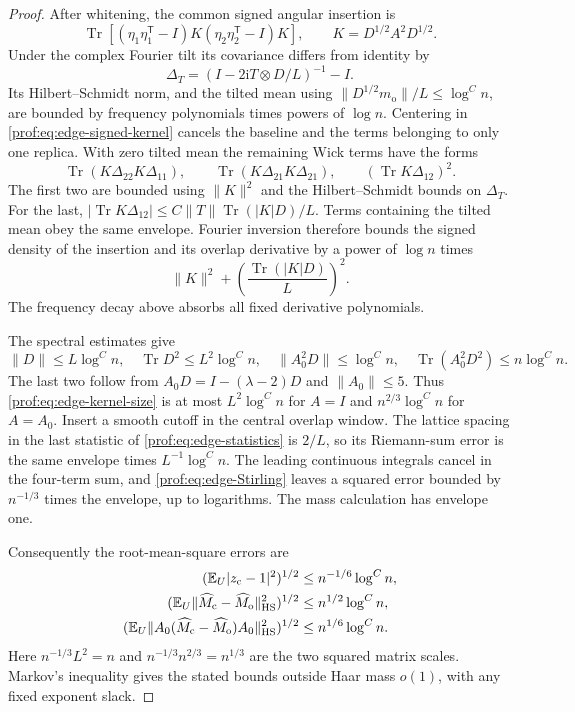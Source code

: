 \begin{proof}
After whitening, the common signed angular insertion is
\begin{equation}\label{prof:eq:edge-signed-kernel}
 \operatorname{Tr}\!\left[
 (\eta_1\eta_1^{\mathsf T}-I)K
 (\eta_2\eta_2^{\mathsf T}-I)K\right],
 \qquad K=D^{1/2}A^2D^{1/2}.
\end{equation}
Under the complex Fourier tilt its covariance differs from identity by
\[
 \Delta_T=(I-2\mathrm iT\otimes D/L)^{-1}-I.
\]
Its Hilbert--Schmidt norm, and the tilted mean using
$\|D^{1/2}m_{\mathrm o}\|/L\le\log^C n$, are bounded by frequency
polynomials times powers of $\log n$. Centering in
\eqref{prof:eq:edge-signed-kernel} cancels the baseline and the terms
belonging to only one replica. With zero tilted mean the remaining Wick
terms have the forms
\[
 \operatorname{Tr}(K\Delta_{22}K\Delta_{11}),\qquad
 \operatorname{Tr}(K\Delta_{21}K\Delta_{21}),\qquad
 (\operatorname{Tr}K\Delta_{12})^2.
\]
The first two are bounded using $\|K\|^2$ and the Hilbert--Schmidt
bounds on $\Delta_T$. For the last,
$|\operatorname{Tr}K\Delta_{12}|\le
 C\|T\|\operatorname{Tr}(|K|D)/L$. Terms containing the tilted mean
obey the same envelope. Fourier inversion therefore bounds the signed
density of the insertion and its overlap derivative by a power of
$\log n$ times
\begin{equation}\label{prof:eq:edge-kernel-size}
 \|K\|^2+\left(\frac{\operatorname{Tr}(|K|D)}L\right)^2.
\end{equation}
The frequency decay above absorbs all fixed derivative polynomials.

The spectral estimates give
\[
 \|D\|\le L\log^C n,\quad \operatorname{Tr}D^2\le L^2\log^C n,
 \quad \|A_0^2D\|\le\log^C n,\quad
 \operatorname{Tr}(A_0^2D^2)\le n\log^C n.
\]
The last two follow from $A_0D=I-(\lambda-2)D$ and $\|A_0\|\le5$.
Thus \eqref{prof:eq:edge-kernel-size} is at most $L^2\log^C n$ for
$A=I$ and $n^{2/3}\log^C n$ for $A=A_0$. Insert a smooth cutoff in
the central overlap window. The lattice spacing in the last statistic
of \eqref{prof:eq:edge-statistics} is $2/L$, so its Riemann-sum error
is the same envelope times $L^{-1}\log^C n$. The leading continuous
integrals cancel in the four-term sum, and
\eqref{prof:eq:edge-Stirling} leaves a squared error bounded by
$n^{-1/3}$ times the envelope, up to logarithms. The mass calculation
has envelope one.

Consequently the root-mean-square errors are
\[
 \begin{aligned}
 (\mathbb E_U|z_{\mathrm c}-1|^2)^{1/2}
   &\le n^{-1/6}\log^C n,\\
 (\mathbb E_U\|\widehat M_{\mathrm c}-\widehat M_{\mathrm o}\|_{\rm HS}^2)^{1/2}
   &\le n^{1/2}\log^C n,\\
 (\mathbb E_U\|A_0(\widehat M_{\mathrm c}-\widehat M_{\mathrm o})A_0\|_{\rm HS}^2)^{1/2}
   &\le n^{1/6}\log^C n.
 \end{aligned}
\]
Here $n^{-1/3}L^2=n$ and $n^{-1/3}n^{2/3}=n^{1/3}$ are the two
squared matrix scales. Markov's inequality gives the stated bounds
outside Haar mass $o(1)$, with any fixed exponent slack.


\end{proof}
